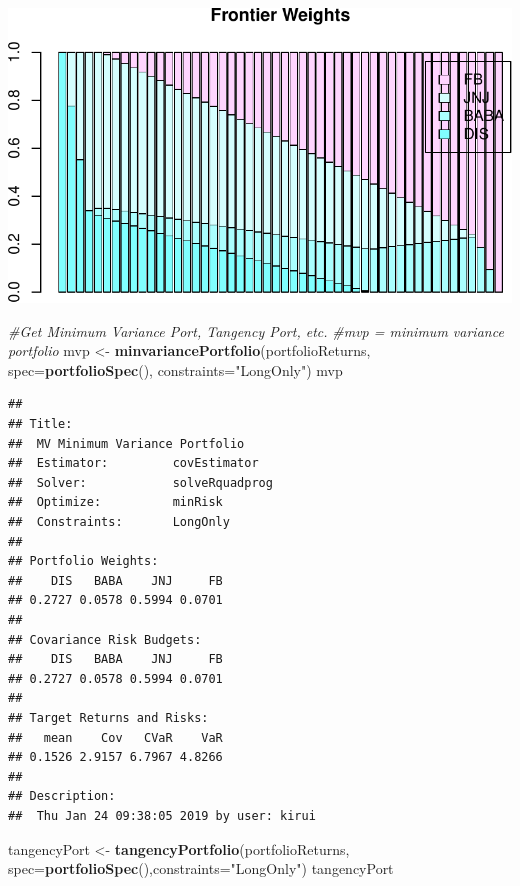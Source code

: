 \documentclass[]{article}
\newenvironment{Shaded}{\begin{snugshade}}{\end{snugshade}}
\newcommand{\KeywordTok}[1]{\textcolor[rgb]{0.13,0.29,0.53}{\textbf{#1}}}
\newcommand{\DataTypeTok}[1]{\textcolor[rgb]{0.13,0.29,0.53}{#1}}
\newcommand{\StringTok}[1]{\textcolor[rgb]{0.31,0.60,0.02}{#1}}
\newcommand{\CommentTok}[1]{\textcolor[rgb]{0.56,0.35,0.01}{\textit{#1}}}
\newcommand{\NormalTok}[1]{#1}
\begin{document}
\includegraphics{Markowitz_Research_Me_files/figure-latex/unnamed-chunk-23-6.pdf}

\begin{Shaded}
\begin{Highlighting}[]
\CommentTok{#Get Minimum Variance Port, Tangency Port, etc.}
\CommentTok{#mvp = minimum variance portfolio}
\NormalTok{mvp <-}\StringTok{ }\KeywordTok{minvariancePortfolio}\NormalTok{(portfolioReturns,}
                            \DataTypeTok{spec=}\KeywordTok{portfolioSpec}\NormalTok{(), }\DataTypeTok{constraints=}\StringTok{"LongOnly"}\NormalTok{)}
\NormalTok{mvp}
\end{Highlighting}
\end{Shaded}

\begin{verbatim}
## 
## Title:
##  MV Minimum Variance Portfolio 
##  Estimator:         covEstimator 
##  Solver:            solveRquadprog 
##  Optimize:          minRisk 
##  Constraints:       LongOnly 
## 
## Portfolio Weights:
##    DIS   BABA    JNJ     FB 
## 0.2727 0.0578 0.5994 0.0701 
## 
## Covariance Risk Budgets:
##    DIS   BABA    JNJ     FB 
## 0.2727 0.0578 0.5994 0.0701 
## 
## Target Returns and Risks:
##   mean    Cov   CVaR    VaR 
## 0.1526 2.9157 6.7967 4.8266 
## 
## Description:
##  Thu Jan 24 09:38:05 2019 by user: kirui
\end{verbatim}

\begin{Shaded}
\begin{Highlighting}[]
\NormalTok{tangencyPort <-}\StringTok{ }\KeywordTok{tangencyPortfolio}\NormalTok{(portfolioReturns,}
                                  \DataTypeTok{spec=}\KeywordTok{portfolioSpec}\NormalTok{(),}\DataTypeTok{constraints=}\StringTok{"LongOnly"}\NormalTok{)}
\NormalTok{tangencyPort}
\end{Highlighting}
\end{Shaded}
\end{document}
